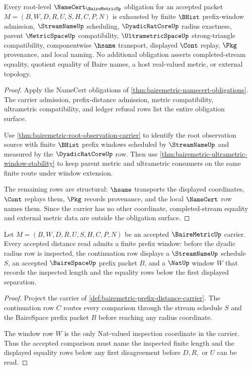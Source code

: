 \begin{theorem}
\label{thm:bairemetric-namecert-obligation-surface}
Every root-level $\NameCert_{\BaireMetricUp}$ obligation for an accepted packet $M=(B,W,D,R,U,S,H,C,P,N)$ is exhausted by finite $\BHist$ prefix-window admission, $\StreamNameUp$ scheduling, $\DyadicRatCoreUp$ radius exactness, parent $\MetricSpaceUp$ compatibility, $\UltrametricSpaceUp$ strong-triangle compatibility, componentwise $\hsame$ transport, displayed $\Cont$ replay, $\Pkg$ provenance, and local naming. No additional obligation asserts completed-stream equality, quotient equality of Baire names, a host real-valued metric, or external topology.
\end{theorem}
\begin{proof}
Apply the NameCert obligations of \autoref{thm:bairemetric-namecert-obligations}. The carrier admission, prefix-distance admission, metric compatibility, ultrametric compatibility, and ledger refusal rows list the entire obligation surface.

Use \autoref{thm:bairemetric-root-observation-carrier} to identify the root observation source with finite $\BHist$ prefix windows scheduled by $\StreamNameUp$ and measured by the $\DyadicRatCoreUp$ row. Then use \autoref{thm:bairemetric-ultrametric-window-stability} to keep parent metric and ultrametric consumers on the same finite route under window extension.

The remaining rows are structural: $\hsame$ transports the displayed coordinates, $\Cont$ replays them, $\Pkg$ records provenance, and the local $\NameCert$ row names them. Since the carrier has no other coordinate, completed-stream equality and external metric data are outside the obligation surface.
\end{proof}

\begin{theorem}
\label{thm:bairemetric-prefix-window-admission}
Let $M=(B,W,D,R,U,S,H,C,P,N)$ be an accepted $\BaireMetricUp$ carrier. Every accepted distance read admits a finite prefix window: before the dyadic radius row is inspected, the continuation row displays a $\StreamNameUp$ schedule $S$, an accepted $\BaireSpaceUp$ prefix packet $B$, and a $\NatUp$ window $W$ that records the inspected length and the equality rows below the first displayed separation.
\end{theorem}
\begin{proof}
Project the carrier of \autoref{def:bairemetric-prefix-distance-carrier}. The continuation row $C$ routes every comparison through the stream schedule $S$ and the BaireSpace prefix packet $B$ before reaching any radius coordinate.

The window row $W$ is the only Nat-valued inspection coordinate in the carrier. Thus the accepted comparison must name the inspected finite length and the displayed equality rows below any first disagreement before $D,R,$ or $U$ can be read.
\end{proof}

